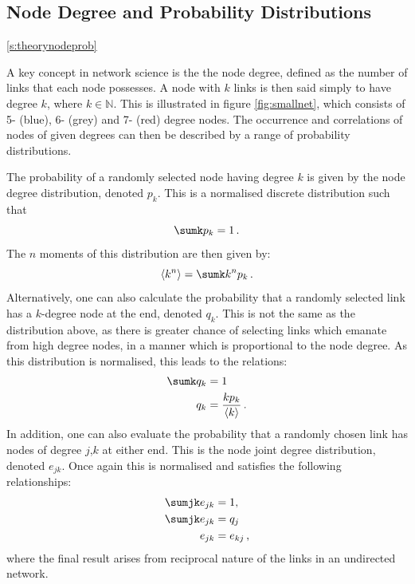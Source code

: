 \subsection{Node Degree and Probability Distributions} 
\ref{s:theorynodeprob}

A key concept in network science is the the node degree, defined as the number of links that each node possesses.
A node with $k$ links is then said simply to have degree $k$, where $k\in\mathbb{N}$.
This is illustrated in figure \ref{fig:smallnet}, which consists of 5\-- (blue), 6\-- (grey) and 7\-- (red) degree nodes.
The occurrence and correlations of nodes of given degrees can then be described by a range of probability distributions.

The probability of a randomly selected node having degree $k$ is given by the node degree distribution, denoted $p_k$.
This is a normalised discrete distribution such that
\begin{equation}
	\label{eq:pknorm}
	\sumk p_k = 1 \,.
\end{equation}
The $n$\th{} moments of this distribution are then given by:
\begin{equation}
	\label{eq:pkmoment}
	\langle k^{n} \rangle = \sumk k^np_k \,.
\end{equation}
Alternatively, one can also calculate the probability that a randomly selected link has a $k$\--degree node at the end, denoted $q_k$.
This is not the same as the distribution above, as there is greater chance of selecting links which emanate from high degree nodes, in a manner which is proportional to the node degree.
As this distribution is normalised, this leads to the relations:
\begin{align}
	\sumk q_k &= 1 \label{eq:qknorm} \\
	q_k &= \frac{kp_k}{\langle k \rangle} \label{eq:qkpk} \,.
\end{align}
In addition, one can also evaluate the probability that a randomly chosen link has nodes of degree $j$,$k$ at either end.
This is the node joint degree distribution, denoted $e_{jk}$. 
Once again this is normalised and satisfies the following relationships:
\begin{align}
	\sumjk e_{jk} &= 1, \label{eq:ejknorm} \\
	\sumjk e_{jk} &= q_j \label{eq:ejkqk} \\
	e_{jk} &= e_{kj} \label{eq:ejkekj} \,,
\end{align}
where the final result arises from reciprocal nature of the links in an undirected network.
